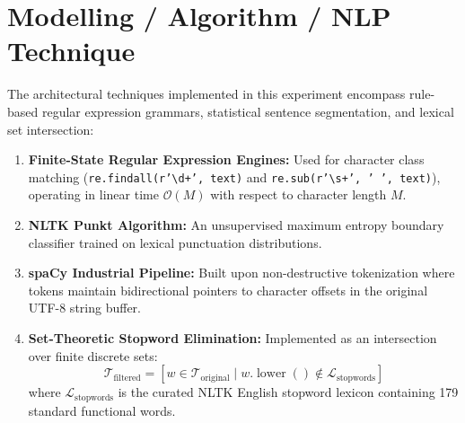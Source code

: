 \section{Modelling / Algorithm / NLP Technique}
The architectural techniques implemented in this experiment encompass rule-based regular expression grammars, statistical sentence segmentation, and lexical set intersection:
\begin{enumerate}
    \item \textbf{Finite-State Regular Expression Engines:} Used for character class matching (\texttt{re.findall(r'\textbackslash d+', text)} and \texttt{re.sub(r'\textbackslash s+', ' ', text)}), operating in linear time $\mathcal{O}(M)$ with respect to character length $M$.
    \item \textbf{NLTK Punkt Algorithm:} An unsupervised maximum entropy boundary classifier trained on lexical punctuation distributions.
    \item \textbf{spaCy Industrial Pipeline:} Built upon non-destructive tokenization where tokens maintain bidirectional pointers to character offsets in the original UTF-8 string buffer.
    \item \textbf{Set-Theoretic Stopword Elimination:} Implemented as an intersection over finite discrete sets:
    \begin{equation}
        \mathcal{T}_{\text{filtered}} = [w \in \mathcal{T}_{\text{original}} \mid w.\operatorname{lower}() \notin \mathcal{L}_{\text{stopwords}}]
    \end{equation}
    where $\mathcal{L}_{\text{stopwords}}$ is the curated NLTK English stopword lexicon containing 179 standard functional words.
\end{enumerate}

